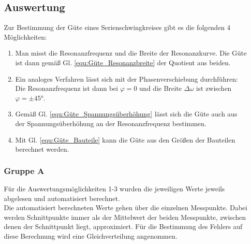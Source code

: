 \documentclass[12pt,a4paper]{article}
\begin{document}
\subsection{Auswertung}
Zur Bestimmung der Güte eines Serienschwingkreises gibt es die folgenden 4 Möglichkeiten:
\begin{enumerate}
\item Man misst die Resonanzfrequenz und die Breite der Resonanzkurve. Die Güte ist dann gemäß Gl. \ref{equ:Güte_Resonanzbreite} der Quotient aus beiden.
\item Ein analoges Verfahren lässt sich mit der Phasenverschiebung durchführen: Die Resonanzfrequenz ist dann bei $\varphi = 0$ und die Breite $\Delta \omega$ ist zwischen $\varphi = \pm \ang{45}$.
\item Gemäß Gl. \ref{equ:Güte_Spannungsüberhöhung} lässt sich die Güte auch aus der Spannungsüberhöhung an der Resonanzfrequenz bestimmen.
\item Mit Gl. \ref{equ:Güte_Bauteile} kann die Güte aus den Größen der Bauteilen berechnet werden.
\end{enumerate}

\subsubsection{Gruppe A}
Für die Auswertungsmöglichkeiten 1-3 wurden die jeweiligen Werte jeweils abgelesen und automatisiert berechnet.\\
Die automatisiert berechneten Werte gehen über die einzelnen Messpunkte. Dabei werden Schnittpunkte immer als der Mittelwert der beiden Messpunkte, zwischen denen der Schnittpunkt liegt, approximiert. Für die Bestimmung des Fehlers auf diese Berechnung wird eine Gleichverteilung angenommen.\\
\end{document}
